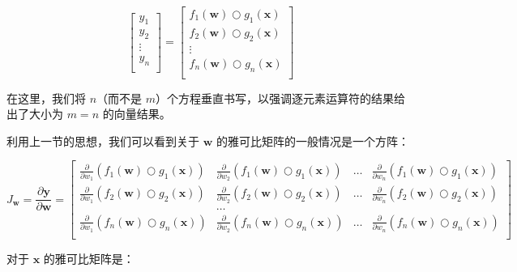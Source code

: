 \documentclass[lang=cn,newtx,10pt,scheme=chinese]{elegantbook}
\begin{document}
\[\begin{bmatrix}
           y_1\\
           y_2\\
           \vdots \\
           y_n\\
           \end{bmatrix} = \begin{bmatrix}
           f_{1}(\mathbf{w}) \bigcirc g_{1}(\mathbf{x})\\
           f_{2}(\mathbf{w}) \bigcirc g_{2}(\mathbf{x})\\
           \vdots \\
           f_{n}(\mathbf{w}) \bigcirc g_{n}(\mathbf{x})\\
         \end{bmatrix}\]

在这里，我们将 $n$（而不是 $m$）个方程垂直书写，以强调逐元素运算符的结果给出了大小为 $m=n$ 的向量结果。

利用上一节的思想，我们可以看到关于 $\mathbf{w}$ 的雅可比矩阵的一般情况是一个方阵：

\[J_\mathbf{w} = 
\frac{\partial \mathbf{y}}{\partial \mathbf{w}}  = \begin{bmatrix}
\frac{\partial}{\partial w_1} ( f_{1}(\mathbf{w}) \bigcirc g_{1}(\mathbf{x}) ) & \frac{\partial}{\partial w_2} ( f_{1}(\mathbf{w}) \bigcirc g_{1}(\mathbf{x}) ) & \ldots & \frac{\partial}{\partial w_n} ( f_{1}(\mathbf{w}) \bigcirc g_{1}(\mathbf{x}) )\\
\frac{\partial}{\partial w_1} ( f_{2}(\mathbf{w}) \bigcirc g_{2}(\mathbf{x}) ) & \frac{\partial}{\partial w_2} ( f_{2}(\mathbf{w}) \bigcirc g_{2}(\mathbf{x}) ) & \ldots & \frac{\partial}{\partial w_n} ( f_{2}(\mathbf{w}) \bigcirc g_{2}(\mathbf{x}) )\\
& \ldots\\
\frac{\partial}{\partial w_1} ( f_{n}(\mathbf{w}) \bigcirc g_{n}(\mathbf{x}) ) & \frac{\partial}{\partial w_2} ( f_{n}(\mathbf{w}) \bigcirc g_{n}(\mathbf{x}) ) & \ldots & \frac{\partial}{\partial w_n} ( f_{n}(\mathbf{w}) \bigcirc g_{n}(\mathbf{x}) )\\
\end{bmatrix}\]

对于 $\mathbf{x}$ 的雅可比矩阵是：
\end{document}
